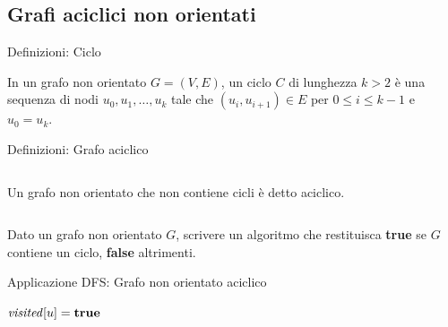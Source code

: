 \subsection{Grafi aciclici non orientati}

\begin{frame}{Definizioni: Ciclo}
	
\vspace{-9pt}
\begin{myboxtitle}
In un grafo non orientato $G=(V,E)$, un \alert{ciclo} $C$ di lunghezza $k > 2$ è una sequenza di nodi $u_0, u_1, \ldots, u_k$ tale che $(u_i, u_{i+1}) \in E$ per $0 \leq i \leq k-1$ e $u_0 = u_k$.
\end{myboxtitle}


\end{frame}


\begin{frame}{Definizioni: Grafo aciclico}

\vspace{-9pt}
\begin{columns}[T]

\begin{myboxtitle}
Un grafo non orientato che non contiene cicli è detto \alert{aciclico}.
\end{myboxtitle}
\vspace{-12pt}
\end{columns}

\bigskip
\begin{myboxtitle}[Problema]
Dato un grafo non orientato $G$, scrivere un algoritmo che restituisca \textbf{true} se $G$ contiene un ciclo, \textbf{false}
altrimenti.
\end{myboxtitle}

\end{frame}

\begin{frame}[shrink=10]{Applicazione DFS: Grafo non orientato aciclico}

\large
\begin{Procedure}
\caption[A]{$\BOOLEAN\ \textsf{hasCycleRec}(\Graph\ G,\ \Node\ u, \Node\ p, \BOOLEAN[\,]\ \mmark)$}

$\mmark[u] = \TRUE$\;
{
  \uIf{$\mmark[v]$}
  {
    \Return \TRUE\;
  }
  {
    \Return \TRUE\;
  }
}
\Return \FALSE\;
\end{Procedure}

\end{frame}


